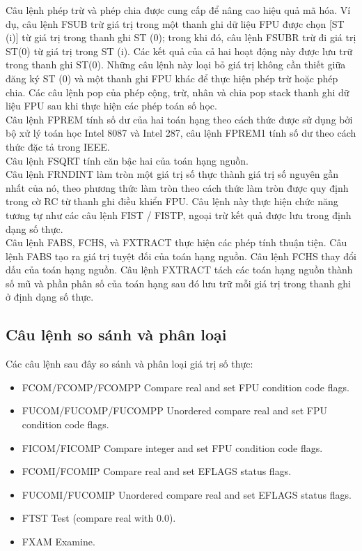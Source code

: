 		Câu lệnh phép trừ và phép chia được cung cấp để nâng cao hiệu quả mã hóa. Ví dụ, câu lệnh FSUB trừ giá trị trong một thanh ghi dữ liệu FPU được chọn [ST (i)] từ giá trị trong thanh ghi ST (0); trong khi đó, câu lệnh FSUBR trừ đi giá trị ST(0) từ giá trị trong ST (i). Các kết quả của cả hai hoạt động này được lưu trữ trong thanh ghi ST(0). Những câu lệnh này loại bỏ giá trị không cần thiết giữa đăng ký ST (0) và một thanh ghi FPU khác để thực hiện phép trừ hoặc phép chia.
Các câu lệnh pop của phép cộng, trừ, nhân và chia pop stack thanh ghi dữ liệu FPU sau khi thực hiện các phép toán số học.\\

		Câu lệnh FPREM tính số dư của hai toán hạng theo cách thức được sử dụng bởi bộ xử lý toán học Intel 8087 và Intel 287, câu lệnh FPREM1 tính số dư theo cách thức đặc tả trong IEEE.\\
		
		Câu lệnh FSQRT tính căn bậc hai của toán hạng nguồn.\\
		
		Câu lệnh FRNDINT làm tròn một giá trị số thực thành giá trị số nguyên gần nhất của nó, theo phương thức làm tròn theo cách thức làm tròn được quy định trong cờ RC từ thanh ghi điều khiển FPU. Câu lệnh này thực hiện chức năng tương tự như các câu lệnh FIST / FISTP, ngoại trừ kết quả được lưu trong định dạng số thực.\\
		
		Câu lệnh FABS, FCHS, và FXTRACT thực hiện các phép tính thuận tiện. Câu lệnh FABS tạo ra giá trị tuyệt đối của toán hạng nguồn. Câu lệnh FCHS thay đổi dấu của toán hạng nguồn. Câu lệnh FXTRACT tách các toán hạng nguồn thành số mũ và phần phân số của toán hạng sau đó lưu trữ mỗi giá trị trong thanh ghi ở định dạng số thực.
		
 		\subsection*{Câu lệnh so sánh và phân loại} 
		Các câu lệnh sau đây so sánh và phân loại giá trị số thực:
		\begin{itemize}
			\renewcommand{\labelitemi}{}
			\item	FCOM/FCOMP/FCOMPP Compare real and set FPU condition code flags.
			\item	FUCOM/FUCOMP/FUCOMPP Unordered compare real and set FPU condition code flags.
			\item	FICOM/FICOMP Compare integer and set FPU condition code flags.
			\item	FCOMI/FCOMIP Compare real and set EFLAGS status flags.
			\item	FUCOMI/FUCOMIP Unordered compare real and set EFLAGS status flags.
			\item	FTST Test (compare real with 0.0).
			\item	FXAM Examine.
		\end{itemize}

